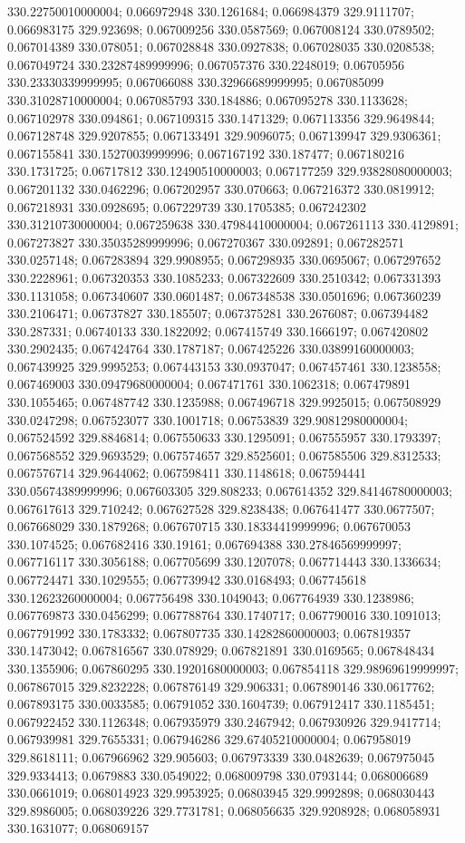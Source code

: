 330.22750010000004; 0.066972948 330.1261684; 0.066984379 329.9111707; 0.066983175 329.923698; 0.067009256 330.0587569; 0.067008124 330.0789502; 0.067014389 330.078051; 0.067028848 330.0927838; 0.067028035 330.0208538; 0.067049724 330.23287489999996; 0.067057376 330.2248019; 0.06705956 330.23330339999995; 0.067066088 330.32966689999995; 0.067085099 330.31028710000004; 0.067085793 330.184886; 0.067095278 330.1133628; 0.067102978 330.094861; 0.067109315 330.1471329; 0.067113356 329.9649844; 0.067128748 329.9207855; 0.067133491 329.9096075; 0.067139947 329.9306361; 0.067155841 330.15270039999996; 0.067167192 330.187477; 0.067180216 330.1731725; 0.06717812 330.12490510000003; 0.067177259 329.93828080000003; 0.067201132 330.0462296; 0.067202957 330.070663; 0.067216372 330.0819912; 0.067218931 330.0928695; 0.067229739 330.1705385; 0.067242302 330.31210730000004; 0.067259638 330.47984410000004; 0.067261113 330.4129891; 0.067273827 330.35035289999996; 0.067270367 330.092891; 0.067282571 330.0257148; 0.067283894 329.9908955; 0.067298935 330.0695067; 0.067297652 330.2228961; 0.067320353 330.1085233; 0.067322609 330.2510342; 0.067331393 330.1131058; 0.067340607 330.0601487; 0.067348538 330.0501696; 0.067360239 330.2106471; 0.06737827 330.185507; 0.067375281 330.2676087; 0.067394482 330.287331; 0.06740133 330.1822092; 0.067415749 330.1666197; 0.067420802 330.2902435; 0.067424764 330.1787187; 0.067425226 330.03899160000003; 0.067439925 329.9995253; 0.067443153 330.0937047; 0.067457461 330.1238558; 0.067469003 330.09479680000004; 0.067471761 330.1062318; 0.067479891 330.1055465; 0.067487742 330.1235988; 0.067496718 329.9925015; 0.067508929 330.0247298; 0.067523077 330.1001718; 0.06753839 329.90812980000004; 0.067524592 329.8846814; 0.067550633 330.1295091; 0.067555957 330.1793397; 0.067568552 329.9693529; 0.067574657 329.8525601; 0.067585506 329.8312533; 0.067576714 329.9644062; 0.067598411 330.1148618; 0.067594441 330.05674389999996; 0.067603305 329.808233; 0.067614352 329.84146780000003; 0.067617613 329.710242; 0.067627528 329.8238438; 0.067641477 330.0677507; 0.067668029 330.1879268; 0.067670715 330.18334419999996; 0.067670053 330.1074525; 0.067682416 330.19161; 0.067694388 330.27846569999997; 0.067716117 330.3056188; 0.067705699 330.1207078; 0.067714443 330.1336634; 0.067724471 330.1029555; 0.067739942 330.0168493; 0.067745618 330.12623260000004; 0.067756498 330.1049043; 0.067764939 330.1238986; 0.067769873 330.0456299; 0.067788764 330.1740717; 0.067790016 330.1091013; 0.067791992 330.1783332; 0.067807735 330.14282860000003; 0.067819357 330.1473042; 0.067816567 330.078929; 0.067821891 330.0169565; 0.067848434 330.1355906; 0.067860295 330.19201680000003; 0.067854118 329.98969619999997; 0.067867015 329.8232228; 0.067876149 329.906331; 0.067890146 330.0617762; 0.067893175 330.0033585; 0.06791052 330.1604739; 0.067912417 330.1185451; 0.067922452 330.1126348; 0.067935979 330.2467942; 0.067930926 329.9417714; 0.067939981 329.7655331; 0.067946286 329.67405210000004; 0.067958019 329.8618111; 0.067966962 329.905603; 0.067973339 330.0482639; 0.067975045 329.9334413; 0.0679883 330.0549022; 0.068009798 330.0793144; 0.068006689 330.0661019; 0.068014923 329.9953925; 0.06803945 329.9992898; 0.068030443 329.8986005; 0.068039226 329.7731781; 0.068056635 329.9208928; 0.068058931 330.1631077; 0.068069157 